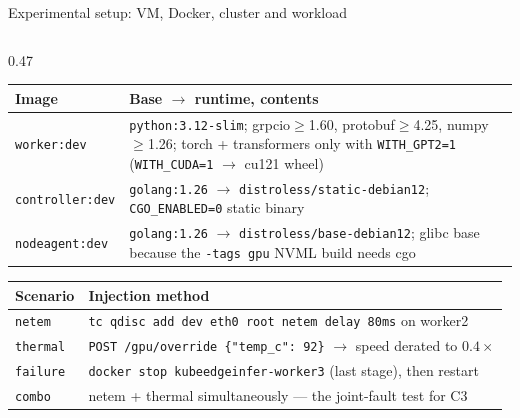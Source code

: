\documentclass[aspectratio=169,9pt]{beamer}
\begin{document}
\begin{frame}[shrink=25]{Experimental setup: VM, Docker, cluster and workload}
\begin{columns}[T]
    \begin{column}{0.47\textwidth}
      \scriptsize
      \begin{tabularx}{\textwidth}{@{}p{1.5cm} X@{}}
        \toprule
        \color{keNavy}\bfseries Image & \color{keNavy}\bfseries Base $\to$ runtime, contents \\
        \midrule
        \texttt{worker:dev} & \texttt{python:3.12-slim}; grpcio$\ge$1.60,
          protobuf$\ge$4.25, numpy$\ge$1.26; torch + transformers only with
          \texttt{WITH\_GPT2=1} (\texttt{WITH\_CUDA=1} $\to$ cu121 wheel) \\
        \texttt{controller:dev} & \texttt{golang:1.26} $\to$
          \texttt{distroless/static-debian12}; \texttt{CGO\_ENABLED=0} static
          binary \\
        \texttt{nodeagent:dev} & \texttt{golang:1.26} $\to$
          \texttt{distroless/base-debian12}; glibc base because the
          \texttt{-tags gpu} NVML build needs cgo \\
        \bottomrule
      \end{tabularx}
      \vspace{0.5em}
      \begin{tabularx}{\textwidth}{@{}p{1.5cm} X@{}}
        \toprule
        \color{keNavy}\bfseries Scenario & \color{keNavy}\bfseries Injection method \\
        \midrule
        \texttt{netem} & \texttt{tc qdisc add dev eth0 root netem delay 80ms}
          on worker2 \\
        \texttt{thermal} & \texttt{POST /gpu/override \{"temp\_c": 92\}} $\to$
          speed derated to $0.4\times$ \\
        \texttt{failure} & \texttt{docker stop kubeedgeinfer-worker3} (last
          stage), then restart \\
        \texttt{combo} & netem + thermal simultaneously --- the joint-fault
          test for C3 \\
        \bottomrule
      \end{tabularx}
    \end{column}
  \end{columns}
\end{frame}
\end{document}
